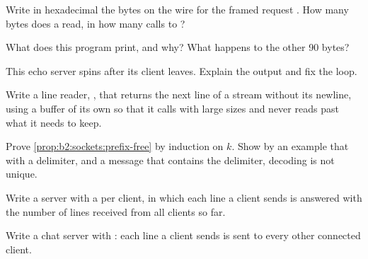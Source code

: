 \begin{exercise}[$\star$]\label{exo:b2:sockets:4}
Write in hexadecimal the bytes on the wire for the framed request . How many bytes does a
 read, in how many calls to ?
\end{exercise}

\begin{exercise}[$\star\star$]\label{exo:b2:sockets:5}
What does this program print, and why? What happens to the other 90 bytes?
\end{exercise}

\begin{exercise}[$\star\star$]\label{exo:b2:sockets:6}
This echo server spins after its client leaves. Explain the output and fix the loop.
\end{exercise}

\begin{exercise}[$\star\star$]\label{exo:b2:sockets:7}
Write a line reader, , that returns the next line of a stream without its newline, using a
buffer of its own so that it calls  with large sizes and never reads past what it needs to keep.
\end{exercise}

\begin{exercise}[$\star\star$]\label{exo:b2:sockets:8}
Prove \cref{prop:b2:sockets:prefix-free} by induction on $k$. Show by an example that with a delimiter, and a message
that contains the delimiter, decoding is not unique.
\end{exercise}

\begin{exercise}[$\star\star$]\label{exo:b2:sockets:9}
Write a server with a  per client, in which each line a client sends is answered with the number of lines
received from all clients so far.
\end{exercise}

\begin{exercise}[$\star\star\star$]\label{exo:b2:sockets:10}
Write a chat server with : each line a client sends is sent to every other connected client.
\end{exercise}

